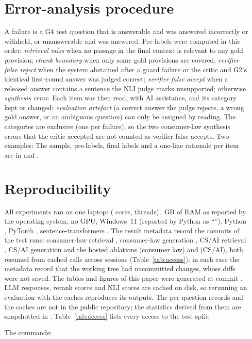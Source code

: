 \section{Error-analysis procedure}
\label{app:errors}

A failure is a G4 test question that is answerable and was answered incorrectly or withheld, or unanswerable and was answered.
Pre-labels were computed in this order: \emph{retrieval miss} when no passage in the final context is relevant to any gold provision; \emph{chunk boundary} when only some gold provisions are covered; \emph{verifier false reject} when the system abstained after a guard failure or the critic and G2's identical first-round answer was judged correct; \emph{verifier false accept} when a released answer contains a sentence the NLI judge marks unsupported; otherwise \emph{synthesis error}.
Each item was then read, with AI assistance, and its category kept or changed; \emph{evaluation artefact} (a correct answer the judge rejects, a wrong gold answer, or an ambiguous question) can only be assigned by reading.
The categories are exclusive (one per failure), so the two consumer-law synthesis errors that the critic accepted are not counted as verifier false accepts. Two examples:
{\small}
The sample, pre-labels, final labels and a one-line rationale per item are in  and .

\section{Reproducibility}
\label{app:repro}
All experiments ran on one laptop:  ( cores,  threads), \,GB of RAM as reported by the operating system, no GPU, Windows~11 (reported by Python as ``''), Python , PyTorch , sentence-transformers .
The result metadata record the commits of the test runs: consumer-law retrieval , consumer-law generation , CS/AI retrieval , CS/AI generation  and the hosted ablations  (consumer law) and  (CS/AI), both resumed from cached calls across sessions (Table~\ref{tab:access}); in each case the metadata record that the working tree had uncommitted changes, whose diffs were not saved.
The tables and figures of this paper were generated at commit .
LLM responses, rerank scores and NLI scores are cached on disk, so rerunning an evaluation with the caches reproduces its outputs. The per-question records and the caches are not in the public repository; the statistics derived from them are snapshotted in .
Table~\ref{tab:access} lists every access to the test split.

The commands:

